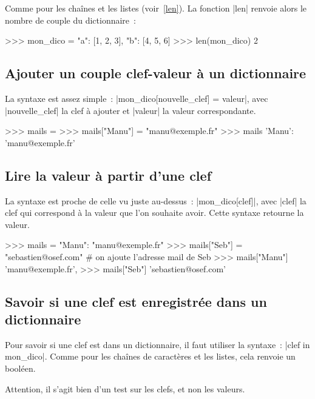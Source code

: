 		Comme pour les chaînes et les listes (voir~\ref{len}). La fonction \python|len| renvoie alors le nombre de couple du dictionnaire~:
		
		\begin{pythoncode}
			>>> mon_dico = {"a": [1, 2, 3], "b": [4, 5, 6]}
			>>> len(mon_dico)
			2
		\end{pythoncode}
	
	\subsection{Ajouter un couple clef-valeur à un dictionnaire}
		
		La syntaxe est assez simple~: \python|mon_dico[nouvelle_clef] = valeur|, avec \python|nouvelle_clef| la clef à ajouter et \python|valeur| la valeur correspondante.

		\begin{pythoncode}
			>>> mails = {}
			>>> mails["Manu"] = "manu@exemple.fr"
			>>> mails
			{'Manu': 'manu@exemple.fr'}
		\end{pythoncode}
	
	\subsection{Lire la valeur à partir d'une clef}
		
		La syntaxe est proche de celle vu juste au-dessus~: \python|mon_dico[clef]|, avec \python|clef| la clef qui correspond à la valeur que l'on souhaite avoir. Cette syntaxe retourne la valeur.
		
		\begin{pythoncode}
			>>> mails = {"Manu": "manu@exemple.fr"}
			>>> mails["Seb"] = "sebastien@osef.com" # on ajoute l'adresse mail de Seb
			>>> mails["Manu"]
			'manu@exemple.fr',
			>>> mails["Seb"]
			'sebastien@osef.com'
		\end{pythoncode}
	
	\subsection{Savoir si une clef est enregistrée dans un dictionnaire}
		
		Pour savoir si une clef est dans un dictionnaire, il faut utiliser la syntaxe~: \python|clef in mon_dico|. Comme pour les chaînes de caractères et les listes, cela renvoie un booléen.
		
		Attention, il s'agit bien d'un test sur les clefs, et non les valeurs.
		

